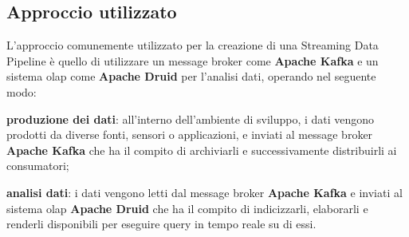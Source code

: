 \subsection{Approccio utilizzato}\label{sec:approccio_utilizzato}
L'approccio comunemente utilizzato per la creazione di una Streaming \gls{Data Pipeline}{} è quello di utilizzare un \gls{message broker}{} come \textbf{Apache Kafka} e un sistema \gls{olap}{} come \textbf{Apache Druid} per l'analisi dati, operando nel seguente modo:\\
\begin{list}{*}
    \item \textbf{produzione dei dati}: all'interno dell'ambiente di sviluppo, i dati vengono prodotti da diverse fonti, sensori o applicazioni, e inviati al \gls{message broker}{} \textbf{Apache Kafka} 
    che ha il compito di archiviarli e successivamente distribuirli ai consumatori;
    \item \item \textbf{analisi dati}: i dati vengono letti dal \gls{message broker}{} \textbf{Apache Kafka} e inviati al sistema \gls{olap}{} \textbf{Apache Druid} che ha il compito di indicizzarli, elaborarli e renderli disponibili per eseguire query in tempo reale su di essi.
\end{list}

\newpage
\pagestyle{empty}
\null %
\newpage